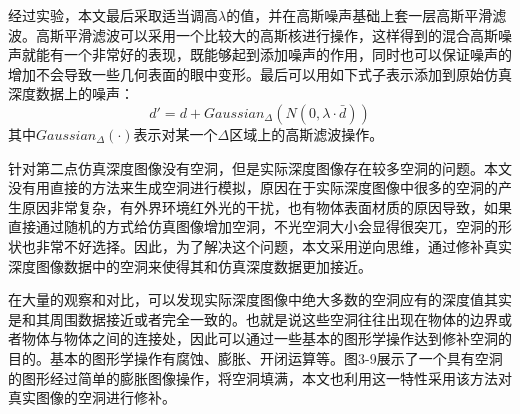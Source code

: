 经过实验，本文最后采取适当调高$\lambda$的值，并在高斯噪声基础上套一层高斯平滑滤波。高斯平滑滤波可以采用一个比较大的高斯核进行操作，这样得到的混合高斯噪声就能有一个非常好的表现，既能够起到添加噪声的作用，同时也可以保证噪声的增加不会导致一些几何表面的眼中变形。最后可以用如下式子表示添加到原始仿真深度数据上的噪声：
\begin{equation}
	d'=d+Gaussian_{\Delta}(N(0, \lambda \cdot \bar{d}))
\end{equation}
其中$Gaussian_{\Delta}(\cdot)$表示对某一个$\Delta$区域上的高斯滤波操作。

针对第二点仿真深度图像没有空洞，但是实际深度图像存在较多空洞的问题。本文没有用直接的方法来生成空洞进行模拟，原因在于实际深度图像中很多的空洞的产生原因非常复杂，有外界环境红外光的干扰，也有物体表面材质的原因导致，如果直接通过随机的方式给仿真图像增加空洞，不光空洞大小会显得很突兀，空洞的形状也非常不好选择。因此，为了解决这个问题，本文采用逆向思维，通过修补真实深度图像数据中的空洞来使得其和仿真深度数据更加接近。

在大量的观察和对比，可以发现实际深度图像中绝大多数的空洞应有的深度值其实是和其周围数据接近或者完全一致的。也就是说这些空洞往往出现在物体的边界或者物体与物体之间的连接处，因此可以通过一些基本的图形学操作达到修补空洞的目的。基本的图形学操作有腐蚀、膨胀、开闭运算等。图3-9展示了一个具有空洞的图形经过简单的膨胀图像操作，将空洞填满，本文也利用这一特性采用该方法对真实图像的空洞进行修补。

